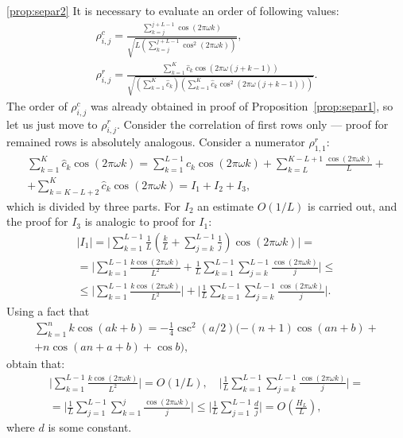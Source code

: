 \documentclass[12pt,a4paper,fleqn,leqno]{article}
\begin{document}
\begin{proof5}{\ref{prop:separ2}}
It is necessary to evaluate an order of following values:
\begin{gather*}
\rho^c_{i,j} = \frac{\sum_{k=j}^{j + L - 1} \cos(2 \pi \omega k)}{\sqrt{L (\sum_{k=j}^{j + L - 1} \cos^2(2 \pi \omega k))}}, \\ \rho^r_{i,j} = \frac{\sum_{k=1}^K \hat c_k\cos(2 \pi \omega (j + k - 1))}{\sqrt{(\sum_{k=1}^K \hat c_k) (\sum_{k=1}^K \hat c_k\cos^2(2 \pi \omega (j + k - 1)))}}.
\end{gather*}
 The order of $\rho^c_{i,j}$ was already obtained in proof of Proposition~\ref{prop:separ1}, so let us just move to $\rho^r_{i,j}$. Consider the correlation of first rows only --- proof for remained rows is absolutely analogous. Consider a numerator $\rho^r_{1,1}$:
\begin{gather*}
\sum_{k=1}^K \hat c_k\cos(2 \pi \omega k) = \sum_{k=1}^{L-1} \hat c_k\cos(2 \pi \omega k) + \sum_{k=L}^{K - L + 1} \frac{\cos(2 \pi \omega k)}{L} +\\+ \sum_{k=K - L + 2}^{K} \hat c_k\cos(2 \pi \omega k) = I_1 + I_2 + I_3,
\end{gather*}
which is divided by three parts. For $I_2$ an estimate $O(1/L)$ is carried out, and the proof for $I_3$ is analogic to proof for $I_1$:
\begin{gather*}
|I_1|=\bigg|\sum_{k=1}^{L-1}\frac{1}{L}\left(\frac{k}{L} + \sum_{j=k}^{L-1} \frac{1}{j} \right) \cos(2 \pi \omega k)\bigg| =\\= \bigg|\sum_{k=1}^{L-1} \frac{k \cos(2 \pi \omega k)}{L^2} +  \frac{1}{L}\sum_{k = 1}^{L-1}\sum_{j = k}^{L-1}\frac{\cos(2 \pi \omega k)}{j}\bigg| \le \\ \le
\bigg|\sum_{k=1}^{L-1} \frac{k \cos(2 \pi \omega k)}{L^2}\bigg| + \bigg|\frac{1}{L}\sum_{k = 1}^{L-1}\sum_{j = k}^{L-1}\frac{\cos(2 \pi \omega k)}{j}\bigg|.
\end{gather*}
Using a fact that
\begin{gather*}
\sum_{k=1}^n k \cos(ak + b) = -\frac{1}{4}\csc^2(a/2)(-(n+1)\cos(an+b) + \\ + n\cos(an + a + b) + \cos b),
\end{gather*}
obtain that:
\begin{gather*}
\bigg|\sum_{k=1}^{L-1} \frac{k \cos(2 \pi \omega k)}{L^2}\bigg| = O(1/L), \quad
\bigg|\frac{1}{L}\sum_{k = 1}^{L-1}\sum_{j = k}^{L-1}\frac{\cos(2 \pi \omega k)}{j}\bigg| = \\ =\bigg|\frac{1}{L}\sum_{j = 1}^{L-1}\sum_{k = 1}^{j}\frac{\cos(2 \pi \omega k)}{j}\bigg| \le \bigg|\frac{1}{L}\sum_{j = 1}^{L-1}\frac{d}{j}\bigg| = O \left(\frac{H_L}{L} \right),
\end{gather*}
where $d$ is some constant.


\end{proof5}
\end{document}
